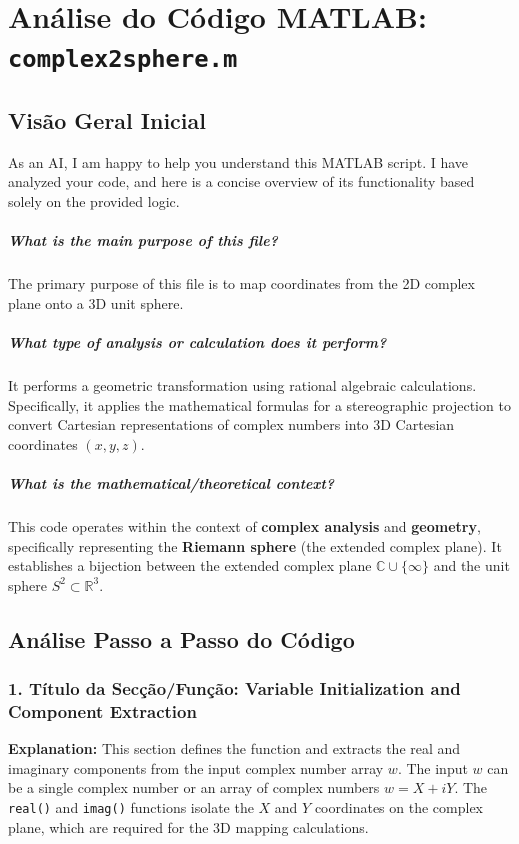 
\chapter{Análise do Código MATLAB: \texttt{complex2sphere.m}}
\section{Visão Geral Inicial}

As an AI, I am happy to help you understand this MATLAB script. I have analyzed your code, and here is a concise overview of its functionality based solely on the provided logic.

\paragraph{What is the main purpose of this file?}
The primary purpose of this file is to map coordinates from the 2D complex plane onto a 3D unit sphere. 

\paragraph{What type of analysis or calculation does it perform?}
It performs a geometric transformation using rational algebraic calculations. Specifically, it applies the mathematical formulas for a stereographic projection to convert Cartesian representations of complex numbers into 3D Cartesian coordinates $(x, y, z)$.

\paragraph{What is the mathematical/theoretical context?}
This code operates within the context of \textbf{complex analysis} and \textbf{geometry}, specifically representing the \textbf{Riemann sphere} (the extended complex plane). It establishes a bijection between the extended complex plane $\mathbb{C} \cup \{\infty\}$ and the unit sphere $S^2 \subset \mathbb{R}^3$.

\section{Análise Passo a Passo do Código}

\subsection*{1. Título da Secção/Função: Variable Initialization and Component Extraction}
\textbf{Explanation:} This section defines the function and extracts the real and imaginary components from the input complex number array $w$. 
The input $w$ can be a single complex number or an array of complex numbers $w = X + iY$. The \texttt{real()} and \texttt{imag()} functions isolate the $X$ and $Y$ coordinates on the complex plane, which are required for the 3D mapping calculations.

